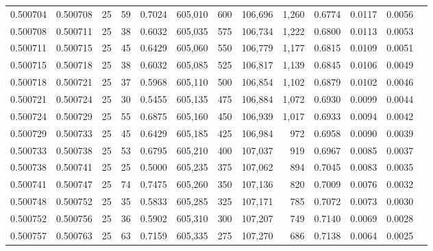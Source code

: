 \begin{tabular}{rrrrrrrrrrrrr}
0.500704 & 0.500708 &    25 &  59 &                                     0.7024 & 605,010 &     600 & 106,696 &   1,260 & 0.6774 & 0.0117 & 0.0056 \\
0.500708 & 0.500711 &    25 &  38 &                                     0.6032 & 605,035 &     575 & 106,734 &   1,222 & 0.6800 & 0.0113 & 0.0053 \\
0.500711 & 0.500715 &    25 &  45 &                                     0.6429 & 605,060 &     550 & 106,779 &   1,177 & 0.6815 & 0.0109 & 0.0051 \\
0.500715 & 0.500718 &    25 &  38 &                                     0.6032 & 605,085 &     525 & 106,817 &   1,139 & 0.6845 & 0.0106 & 0.0049 \\
0.500718 & 0.500721 &    25 &  37 &                                     0.5968 & 605,110 &     500 & 106,854 &   1,102 & 0.6879 & 0.0102 & 0.0046 \\
0.500721 & 0.500724 &    25 &  30 &                                     0.5455 & 605,135 &     475 & 106,884 &   1,072 & 0.6930 & 0.0099 & 0.0044 \\
0.500724 & 0.500729 &    25 &  55 &                                     0.6875 & 605,160 &     450 & 106,939 &   1,017 & 0.6933 & 0.0094 & 0.0042 \\
0.500729 & 0.500733 &    25 &  45 &                                     0.6429 & 605,185 &     425 & 106,984 &     972 & 0.6958 & 0.0090 & 0.0039 \\
0.500733 & 0.500738 &    25 &  53 &                                     0.6795 & 605,210 &     400 & 107,037 &     919 & 0.6967 & 0.0085 & 0.0037 \\
0.500738 & 0.500741 &    25 &  25 &                                     0.5000 & 605,235 &     375 & 107,062 &     894 & 0.7045 & 0.0083 & 0.0035 \\
0.500741 & 0.500747 &    25 &  74 &                                     0.7475 & 605,260 &     350 & 107,136 &     820 & 0.7009 & 0.0076 & 0.0032 \\
0.500748 & 0.500752 &    25 &  35 &                                     0.5833 & 605,285 &     325 & 107,171 &     785 & 0.7072 & 0.0073 & 0.0030 \\
0.500752 & 0.500756 &    25 &  36 &                                     0.5902 & 605,310 &     300 & 107,207 &     749 & 0.7140 & 0.0069 & 0.0028 \\
0.500757 & 0.500763 &    25 &  63 &                                     0.7159 & 605,335 &     275 & 107,270 &     686 & 0.7138 & 0.0064 & 0.0025 \\

\end{tabular}
